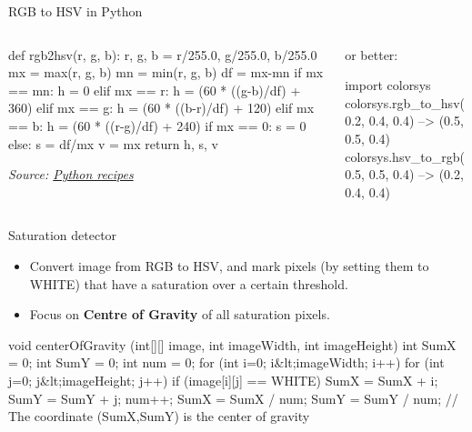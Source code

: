 \documentclass[compress]{beamer}
\newcommand{\source}[2]{{\tiny\it Source: \href{#1}{#2}}}
\begin{document}
\begin{frame}[fragile]{RGB to HSV in Python}

    \begin{columns}
        \begin{column}{0.5\linewidth}
\begin{pythoncode}
def rgb2hsv(r, g, b):
    r, g, b = r/255.0, g/255.0, b/255.0
    mx = max(r, g, b)
    mn = min(r, g, b)
    df = mx-mn
    if mx == mn:
        h = 0
    elif mx == r:
        h = (60 * ((g-b)/df) + 360) %
    elif mx == g:
        h = (60 * ((b-r)/df) + 120) %
    elif mx == b:
        h = (60 * ((r-g)/df) + 240) %
    if mx == 0:
        s = 0
    else:
        s = df/mx
    v = mx
    return h, s, v
\end{pythoncode}
\source{http://code.activestate.com/recipes/576919-python-rgb-and-hsv-conversion/}{Python recipes}
            
        \end{column}
        \begin{column}{0.5\linewidth}
            \vspace{4cm}

or better:

\begin{pythoncode}
import colorsys
colorsys.rgb_to_hsv(0.2, 0.4, 0.4)
--> (0.5, 0.5, 0.4)
colorsys.hsv_to_rgb(0.5, 0.5, 0.4)
--> (0.2, 0.4, 0.4)
\end{pythoncode}

        \end{column}
    \end{columns}


\end{frame}

\begin{frame}[fragile]{Saturation detector}

\begin{itemize}

\item Convert image from RGB to HSV, and mark pixels (by setting them to
  WHITE) that have a saturation over a certain threshold.
\item Focus on \textbf{Centre of Gravity} of all saturation pixels.
\end{itemize}

\begin{matlabcode}
void centerOfGravity (int[][] image, int imageWidth,
        int imageHeight)
{
    int SumX = 0;
    int SumY = 0;
    int num = 0;
    for (int i=0; i&lt;imageWidth; i++)
    {
        for (int j=0; j&lt;imageHeight; j++)
        {
            if (image[i][j] == WHITE)
            {
                SumX = SumX + i;
                SumY = SumY + j;
                num++;
            }
        }
    }
    SumX = SumX / num;
    SumY = SumY / num;
    // The coordinate (SumX,SumY) is the center of gravity
}
\end{matlabcode}

\end{frame}
\end{document}
